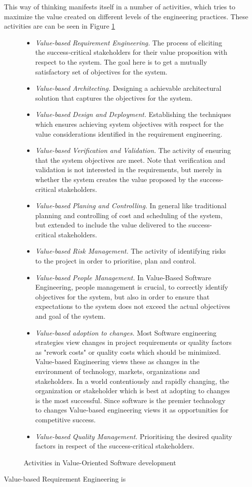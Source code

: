\documentclass{sig-alternate}
\begin{document}
This way of thinking manifests itself in a number of activities, which tries to maximize the value created on different levels of the engineering practices. These activities are can be seen in Figure \ref{fig:vbseActivities}
\begin{figure}
\caption{Activities in Value-Oriented Software development}
\begin{itemize}
\item \textit{Value-based Requirement Engineering.} The process of eliciting the success-critical stakeholders for their value proposition with respect to the system. The goal here is to get a mutually satisfactory set of objectives for the system.
\item \textit{Value-based Architecting.} Designing a achievable architectural solution that captures the objectives for the system. 
\item \textit{Value-based Design and Deployment.} Establishing the techniques which ensures achieving system objectives with respect for the value considerations identified in the requirement engineering.
\item \textit{Value-based Verification and Validation.} The activity of ensuring that the system objectives are meet. Note that verification and validation is not interested in the requirements, but merely in whether the system creates the value proposed by the success-critical stakeholders.  
\item \textit{Value-based Planing and Controlling.} In general like traditional planning and controlling of cost and scheduling of the system, but extended to include the value delivered to the success-critical stakeholders.
\item \textit{Value-based Risk Management.} The activity of identifying risks to the project in order to prioritise, plan and control.
\item \textit{Value-based People Management.} In Value-Based Software Engineering, people management is crucial, to correctly identify objectives for the system, but also in order to ensure that expectations to the system does not exceed the actual objectives and goal of the system. 
\item \textit{Value-based adoption to changes.} Most Software engineering strategies view changes in  project requirements or quality factors as "rework costs" or quality costs which should be minimized. Value-based Engineering views these as changes in the environment of technology, markets, organizations and stakeholders. In a world contentiously and rapidly changing, the organization or stakeholder which is best at adopting to changes is the most successful. Since software is the premier technology to changes \cite{boehm:valuebased} Value-based engineering views it as opportunities for competitive success.
\item \textit{Value-based Quality Management.} Prioritising the desired quality factors in respect of the success-critical stakeholders.
\end{itemize} 
\label{fig:vbseActivities}
\end{figure}
Value-based Requirement Engineering is 
\end{document}
